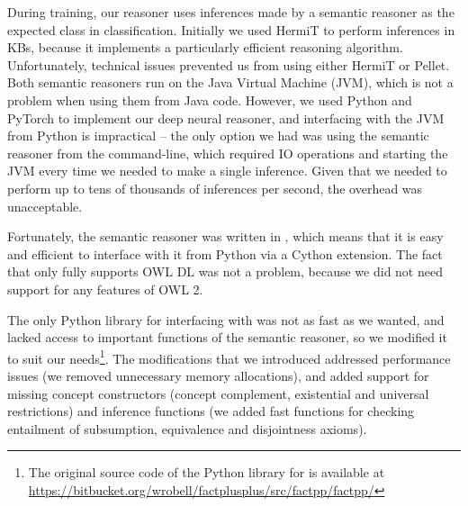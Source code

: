 During training, our reasoner uses inferences made by a semantic reasoner as the expected class in classification.
Initially we used HermiT to perform inferences in KBs, because it implements a particularly efficient reasoning algorithm.
Unfortunately, technical issues prevented us from using either HermiT or Pellet.
Both semantic reasoners run on the Java Virtual Machine (JVM), which is not a problem when using them from Java code.
However, we used Python and PyTorch to implement our deep neural reasoner, and interfacing with the JVM from Python is impractical -- the only option we had was using the semantic reasoner from the command-line, which required IO operations and starting the JVM every time we needed to make a single inference.
Given that we needed to perform up to tens of thousands of inferences per second, the overhead was unacceptable.

Fortunately, the \factpp{} semantic reasoner was written in \cpp{}, which means that it is easy and efficient to interface with it from Python via a Cython extension.
The fact that \factpp{} only fully supports OWL DL was not a problem, because we did not need support for any features of OWL 2.

The only Python library for interfacing with \factpp{} was not as fast as we wanted, and lacked access to important functions of the semantic reasoner, so we modified it to suit our needs\footnote{The original source code of the Python library for \factpp{} is available at \url{https://bitbucket.org/wrobell/factplusplus/src/factpp/factpp/}}.
The modifications that we introduced addressed performance issues (we removed unnecessary memory allocations), and added support for missing concept constructors (concept complement, existential and universal restrictions) and inference functions (we added fast functions for checking entailment of subsumption, equivalence and disjointness axioms).

